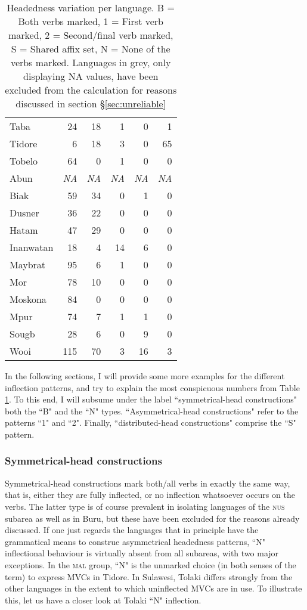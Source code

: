 \begin{table}
\begin{tabular}{lrrrrr}
  Taba &  24 &  18 &   1 &   0 &   1 \tabularnewline 
  Tidore & 6 & 18 & 3 & 0 & 65 \tabularnewline
  Tobelo &  64 &   0 &   1 &   0 &   0 \tabularnewline \hline 
  {\color{gray}Abun} & {\color{gray}\textit{NA}} & {\color{gray}\textit{NA}} & {\color{gray}\textit{NA}} &   {\color{gray}\textit{NA}} & {\color{gray}\textit{NA}} \tabularnewline
  Biak &  59 &  34 &   0 &   1 &   0 \tabularnewline
  Dusner &  36 &  22 &   0 &   0 &   0 \tabularnewline
  Hatam &  47 &  29 &   0 &   0 &   0 \tabularnewline
  Inanwatan &  18 &   4 &  14 &   6 &   0 \tabularnewline
  Maybrat &  95 &   6 &   1 &   0 &   0 \tabularnewline 
  Mor &  78 &  10 &   0 &   0 &   0 \tabularnewline
  Moskona &  84 &   0 &   0 &   0 &   0 \tabularnewline
  Mpur &  74 &   7 &   1 &   1 &   0 \tabularnewline
  Sougb &  28 &   6 &   0 &   9 &   0 \tabularnewline 
  Wooi & 115 &  70 &   3 &  16 &   3 \tabularnewline
   \hline
\end{tabular}
\caption[Headedness variation per language]{Headedness variation per language. B = Both verbs marked, 1 = First verb marked, 2 = Second/final verb marked, S = Shared affix set, N = None of the verbs marked. Languages in grey, only displaying \textsc{NA} values, have been excluded from the calculation for reasons discussed in section §\ref{sec:unreliable}}
\label{table:Headedness_per_lang}


\end{table}


In the following sections, I will provide some more examples for the different inflection patterns, and try to explain the most conspicuous numbers from Table \ref{table:Headedness_per_lang}. To this end, I will subsume under the label ``symmetrical-head constructions" both the ``B" and the ``N" types. ``Asymmetrical-head constructions" refer to the patterns ``1" and ``2". Finally, ``distributed-head constructions" comprise the ``S" pattern.

\subsubsection{Symmetrical-head constructions}\label{sec:symmetrical-head}

Symmetrical-head constructions mark both/all verbs in exactly the same way, that is, either they are fully inflected, or no inflection whatsoever occurs on the verbs. The latter type is of course prevalent in isolating languages of the \textsc{nus} subarea as well as in Buru, but these have been excluded for the reasons already discussed. If one just regards the languages that in principle have the grammatical means to construe asymmetrical headedness patterns, ``N" inflectional behaviour is virtually absent from all subareas, with two major exceptions. In the \textsc{mal} group, ``N" is the unmarked choice (in both senses of the term) to express MVCs in Tidore. In Sulawesi, Tolaki differs strongly from the other languages in the extent to which uninflected MVCs are in use. To illustrate this, let us have a closer look at Tolaki ``N" inflection.

